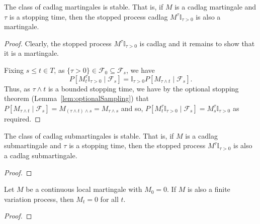 \begin{lemma}\label{lem:stable_IsMartingale}
  \leanok
The class of cadlag martingales is stable. That is, if $M$ is a cadlag martingale and $\tau$ is a stopping time, then the stopped process cadlag $M^{\tau}\mathbb{I}_{\tau > 0}$ is also a martingale.
\end{lemma}

\begin{proof}
  \leanok
  Clearly, the stopped process $M^{\tau}\mathbb{I}_{\tau > 0}$ is cadlag and it remains to show that it is a martingale.

  Fixing $s \le t \in T$, as $\{\tau > 0\} \in \mathcal{F}_0 \subseteq \mathcal{F}_s$, we have
  $$P[M^{\tau}_t \mathbb{I}_{\tau > 0} \mid \mathcal{F}_s] = \mathbb{I}_{\tau > 0}P[M_{\tau \wedge t} \mid \mathcal{F}_{s}].$$
  Thus, as $\tau \wedge t$ is a bounded stopping time, we have by the optional stopping theorem
  (Lemma~\ref{lem:optionalSampling}) that $P[M_{\tau \wedge t} \mid \mathcal{F}_{s}] = M_{(\tau \wedge t) \wedge s} = M_{\tau \wedge s}$
  and so, $P[M^{\tau}_t \mathbb{I}_{\tau > 0} \mid \mathcal{F}_s] = M^{\tau}_s \mathbb{I}_{\tau > 0}$ as required.
\end{proof}


\begin{lemma}\label{lem:stable_IsSubmartingale}
  \leanok
The class of cadlag submartingales is stable. That is, if $M$ is a cadlag submartingale and $\tau$ is a stopping time, then the stopped process $M^{\tau}\mathbb{I}_{\tau > 0}$ is also a cadlag submartingale.
\end{lemma}

\begin{proof}

\end{proof}


\begin{theorem}\label{thm:IsLocalMartingale.eq_zero_of_continuous_finiteVariation}
Let $M$ be a continuous local martingale with $M_0 = 0$. If $M$ is also a finite variation process, then $M_t = 0$ for all $t$.
\end{theorem}

\begin{proof}

\end{proof}



